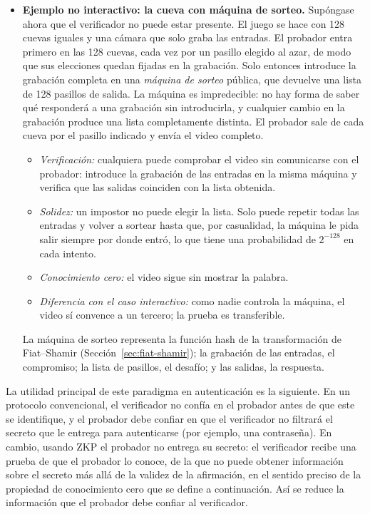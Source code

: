 \begin{itemize}
    \item \textbf{Ejemplo no interactivo: la cueva con máquina de sorteo.}
    Supóngase ahora que el verificador no puede estar presente. El juego se hace con 128 cuevas iguales y una cámara que solo graba las entradas. El probador entra primero en las 128 cuevas, cada vez por un pasillo elegido al azar, de modo que sus elecciones quedan fijadas en la grabación. Solo entonces introduce la grabación completa en una \textit{máquina de sorteo} pública, que devuelve una lista de 128 pasillos de salida. La máquina es impredecible: no hay forma de saber qué responderá a una grabación sin introducirla, y cualquier cambio en la grabación produce una lista completamente distinta. El probador sale de cada cueva por el pasillo indicado y envía el video completo.
    \begin{itemize}
        \item \textit{Verificación:} cualquiera puede comprobar el video sin comunicarse con el probador: introduce la grabación de las entradas en la misma máquina y verifica que las salidas coinciden con la lista obtenida.
        \item \textit{Solidez:} un impostor no puede elegir la lista. Solo puede repetir todas las entradas y volver a sortear hasta que, por casualidad, la máquina le pida salir siempre por donde entró, lo que tiene una probabilidad de $2^{-128}$ en cada intento.
        \item \textit{Conocimiento cero:} el video sigue sin mostrar la palabra.
        \item \textit{Diferencia con el caso interactivo:} como nadie controla la máquina, el video sí convence a un tercero; la prueba es transferible.
    \end{itemize}
    La máquina de sorteo representa la función hash de la transformación de Fiat--Shamir (Sección~\ref{sec:fiat-shamir}); la grabación de las entradas, el compromiso; la lista de pasillos, el desafío; y las salidas, la respuesta.
\end{itemize}

La utilidad principal de este paradigma en autenticación es la siguiente. En un protocolo convencional, el verificador no confía en el probador antes de que este se identifique, y el probador debe confiar en que el verificador no filtrará el secreto que le entrega para autenticarse (por ejemplo, una contraseña). En cambio, usando ZKP el probador no entrega su secreto: el verificador recibe una prueba de que el probador lo conoce, de la que no puede obtener información sobre el secreto más allá de la validez de la afirmación, en el sentido preciso de la propiedad de conocimiento cero que se define a continuación. Así se reduce la información que el probador debe confiar al verificador.

